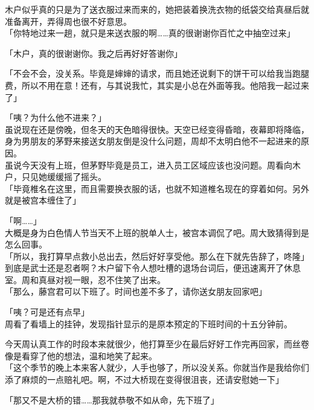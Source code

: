 木户似乎真的只是为了送衣服过来而来的，她把装着换洗衣物的纸袋交给真昼后就准备离开，弄得周也很不好意思。\\

「你特地过来一趟，就只是来送衣服的啊……真的很谢谢你百忙之中抽空过来」

「木户，真的很谢谢你。我之后再好好答谢你」

「不会不会，没关系。毕竟是婶婶的请求，而且她还说剩下的饼干可以给我当跑腿费，所以不用在意！还有，与其说我忙，其实是小总在外面等我。他陪我一起过来了」

「咦？为什么他不进来？」\\

虽说现在还是傍晚，但冬天的天色暗得很快。天空已经变得昏暗，夜幕即将降临，身为男朋友的茅野来接送女朋友倒是没什么问题，周却不太明白他不一起进来的原因。\\

虽说今天没有上班，但茅野毕竟是员工，进入员工区域应该也没问题。周看向木户，只见她缓缓摇了摇头。\\

「毕竟椎名在这里，而且需要换衣服的话，也就不知道椎名现在的穿着如何。另外就是被宫本缠住了」

「啊……」\\

大概是身为白色情人节当天不上班的脱单人士，被宫本调侃了吧。周大致猜得到是怎么回事。\\

「所以，我打算早点救小总出去，然后好好享受他。那么在下就先告辞了，咚隆」\\

到底是武士还是忍者啊？木户留下令人想吐槽的退场台词后，便迅速离开了休息室。周和真昼对视一眼，忍不住笑了出来。\\

「那么，藤宫君可以下班了。时间也差不多了，请你送女朋友回家吧」

「咦？可是还有点早」\\

周看了看墙上的挂钟，发现指针显示的是原本预定的下班时间的十五分钟前。

今天周认真工作的时段本来就很少，他打算至少在最后好好工作完再回家，而丝卷像是看穿了他的想法，温和地笑了起来。\\

「这个季节的晚上本来客人就少，人手也够了，所以没关系。你就当作是我给你们添了麻烦的一点赔礼吧。啊，不过大桥现在变得很沮丧，还请安慰她一下」

「那又不是大桥的错……那我就恭敬不如从命，先下班了」\\

